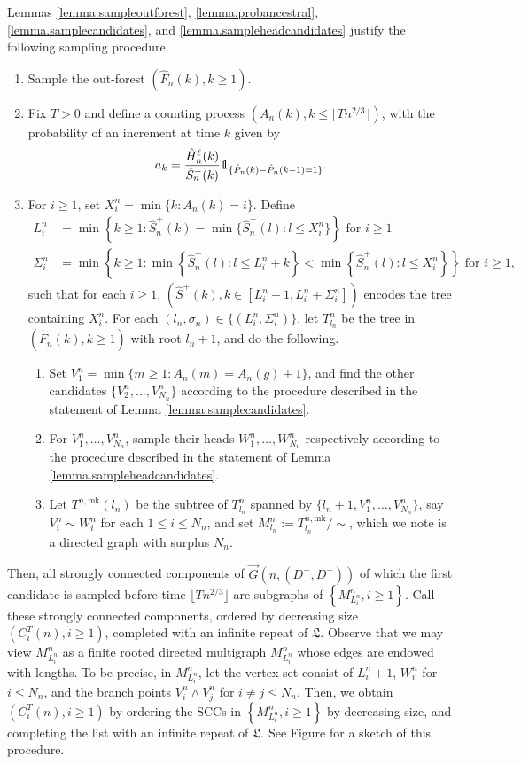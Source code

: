 Lemmas \ref{lemma.sampleoutforest}, \ref{lemma.probancestral}, \ref{lemma.samplecandidates}, and \ref{lemma.sampleheadcandidates} justify the following sampling procedure.
\begin{enumerate}
    \item Sample the out-forest $(\hat{F}_n(k),k\geq 1)$.
    \item Fix $T>0$ and define a counting process $(A_n(k),k\leq \lfloor Tn^{2/3}\rfloor)$, with the probability of an increment at time $k$ given by $$a_k=\frac{\hat{H}_n^\ell(k)}{\hat{S}_n^-(k)}\one_{\{\hat{P}_n(k)-\hat{P}_n(k-1)=1\}}.$$
    \item For $i\geq 1$, set $X_i^n=\min\{k:A_n(k)=i\}$. Define
\begin{align*}L_i^n&=\min\left\{k\geq 1:\hat{S}^{+}_n(k)=\min\{\hat{S}^{+}_n(l):l\leq X_i^n\}\right\}\text{ for }i\geq 1\\
\Sigma_i^n&=\min\left\{k \geq 1: \min\left\{\hat{S}^{+}_n(l):l\leq L_i^n+k\right\} < \min\left\{\hat{S}^{+}_n(l):l\leq X_i^n\right\}\right\}\text{ for }i\geq 1,
\end{align*}
such that for each $i\geq 1$, $\left(\hat{S}^+(k),k\in [L_i^n+1,L_i^n+\Sigma_i^n]\right)$ encodes the tree containing $X_i^n$. For each $(l_n,\sigma_n)\in \{(L_i^n,\Sigma_i^n)\}$, let $T^n_{l_n}$ be the tree in $(\hat{F}_n(k),k\geq 1)$ with root $l_n+1$, and do the following.
    \begin{enumerate}
    \item \label{item.procedure3} Set $V_1^n=\min\{m\geq 1:A_n(m)=A_n(g)+1\}$, and find the other candidates $\{V_2^n,\dots ,V_{N_n}^n\}$ according to the procedure described in the statement of Lemma \ref{lemma.samplecandidates}.
    \item \label{item.procedure4} For $V_1^n,\dots, V_{N_n}^n$, sample their heads $W_1^n,\dots ,W_{N_n}^n$ respectively according to the procedure described in the statement of Lemma \ref{lemma.sampleheadcandidates}.
    \item Let $T^{n,\text{mk}}(l_n)$ be the subtree of $T^n_{l_n}$ spanned by $\{l_n+1,V_1^n,\dots ,V_{N_n}^n\}$, say $V_i^n\sim W_i^n$ for each $1\leq i\leq N_n$, and set $M^n_{l_n}:=T^{n,\text{mk}}_{l_n}/\sim$, which we note is a directed graph with surplus $N_n$. 
\end{enumerate}
\end{enumerate}
Then, all strongly connected components of $\vec{G}(n,(D^-,D^+))$ of which the first candidate is sampled before time $\lfloor Tn^{2/3}\rfloor$ are subgraphs of $\left\{M^n_{L_i^n}, i\geq 1 \right\}$. Call these strongly connected components, ordered by decreasing size $(C_i^T(n),i\geq 1)$, completed with an infinite repeat of $\mathfrak{L}$. Observe that we may view $M^n_{L_i^n}$ as a finite rooted directed multigraph $M^n_{L_i^n}$ whose edges are endowed with lengths. To be precise, in  $M^n_{L_i^n}$, let the vertex set consist of $L_i^n+1$, $W_i^n$ for $i\leq N_n$, and the branch points $V_i^n\wedge V_j^n$ for $i\neq j\leq N_n$. Then, we obtain $(C_i^T(n),i\geq 1)$ by ordering the SCCs in $\left\{M^n_{L_i^n}, i\geq 1 \right\}$ by decreasing size, and completing the list with an infinite repeat of $\mathfrak{L}$. See Figure  for a sketch of this procedure.

